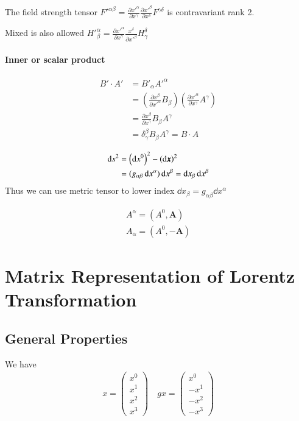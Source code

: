 The field strength tensor $F'^{\alpha\beta} = \frac{\partial x'^\alpha}{\partial x^\gamma} \frac{\partial x'^\beta}{\partial x^\delta} F^{\gamma\delta}$ is contravariant rank 2.

Mixed is also allowed $H'^\alpha_\beta = \frac{\partial x'^\alpha}{\partial x^\gamma} \frac{x^\delta}{\partial x'^\beta} H^\delta_\gamma$ 

\paragraph{Inner or scalar product}
\begin{align*}
   B' \cdot A' &= B'_\alpha A'^\alpha \\
               &= \left( \frac{\partial x^\beta}{\partial x'^\alpha} B_\beta \right) \left( \frac{\partial x'^\alpha}{\partial x^\gamma} A^\gamma \right) \\
               &= \frac{\partial x^\beta}{\partial x^\gamma} B_\beta A^\gamma \\
               &= \delta^\beta_\gamma B_\beta A^\gamma = B \cdot A
\end{align*}

\begin{align}
   \dd{s}^2 &= \left( \dd{x^0} \right)^2 - \left( \dd{\pmb{x}} \right)^2 \notag \\
            &= (g_{\alpha\beta} \dd{x^\alpha}) \dd{x^\beta} = \dd{x_\beta} \dd{x^{\beta}}
\end{align}
Thus we can use metric tensor to lower index $\dd{x_\beta} = g_{\alpha\beta} \dd{x^{\alpha}}$

\begin{align*}
   A^\alpha = \left(A^0, \pmb{A} \right) \\
   A_\alpha = \left(A^0, -\pmb{A} \right)
\end{align*}

\section{Matrix Representation of Lorentz Transformation}
\subsection{General Properties}
We have 
\begin{align*}
   x = \begin{pmatrix} x^0 \\ x^1 \\ x^2 \\ x^3 \end{pmatrix} \quad gx =  \begin{pmatrix} x^0 \\ -x^1 \\ -x^2 \\ -x^3 \end{pmatrix} 
\end{align*}

